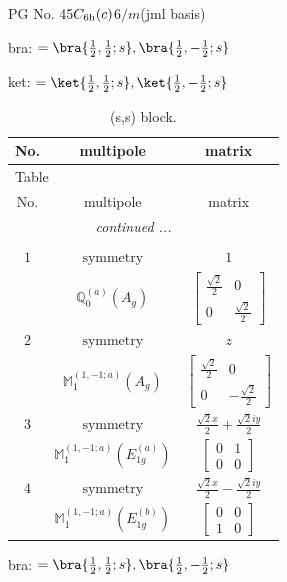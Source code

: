 \documentclass[fleqn,8pt,landscape]{jsarticle}
\begin{document}
\setcounter{MaxMatrixCols}{32}

\renewcommand{\tablename}{Table~}
\renewcommand{\figurename}{Figure~}
\begin{center}
\LARGE
PG No. 45\quad$C_{\rm 6h}(c)$\quad$6/m$\quad[ hexagonal ] (jml basis)
\end{center}
bra: $=\bra{\frac{1}{2},\frac{1}{2};s}, \bra{\frac{1}{2},- \frac{1}{2};s}$

\noindent
ket: $=\ket{\frac{1}{2},\frac{1}{2};s}, \ket{\frac{1}{2},- \frac{1}{2};s}$
\renewcommand{\arraystretch}{1.6}
\begin{longtable}{ccc}
\caption{(s,s) block.}
 \\
 \hline \hline
No. & multipole & matrix \\ \hline \endfirsthead

\multicolumn{2}{l}{\tablename\ \thetable{}} \\
 \hline \hline
No. & multipole & matrix \\ \hline \endhead

 \hline \hline
\multicolumn{2}{r}{\footnotesize\it continued ...} \\ \endfoot

 \hline \hline
\multicolumn{2}{r}{} \\ \endlastfoot

$ 1 $ & $ \text{symmetry} $ & $ 1 $ \\
$  $ & $ \mathbb{Q}_{0}^{(a)}(A_{g}) $ & $ \begin{bmatrix} \frac{\sqrt{2}}{2} & 0 \\ 0 & \frac{\sqrt{2}}{2} \end{bmatrix} $ \\ \hline
$ 2 $ & $ \text{symmetry} $ & $ z $ \\
$  $ & $ \mathbb{M}_{1}^{(1,-1;a)}(A_{g}) $ & $ \begin{bmatrix} \frac{\sqrt{2}}{2} & 0 \\ 0 & - \frac{\sqrt{2}}{2} \end{bmatrix} $ \\ \hline
$ 3 $ & $ \text{symmetry} $ & $ \frac{\sqrt{2} x}{2} + \frac{\sqrt{2} i y}{2} $ \\
$  $ & $ \mathbb{M}_{1}^{(1,-1;a)}(E_{1g}^{(a)}) $ & $ \begin{bmatrix} 0 & 1 \\ 0 & 0 \end{bmatrix} $ \\ \hline
$ 4 $ & $ \text{symmetry} $ & $ \frac{\sqrt{2} x}{2} - \frac{\sqrt{2} i y}{2} $ \\
$  $ & $ \mathbb{M}_{1}^{(1,-1;a)}(E_{1g}^{(b)}) $ & $ \begin{bmatrix} 0 & 0 \\ 1 & 0 \end{bmatrix} $ \\ \hline
\end{longtable}
bra: $=\bra{\frac{1}{2},\frac{1}{2};s}, \bra{\frac{1}{2},- \frac{1}{2};s}$
\end{document}

